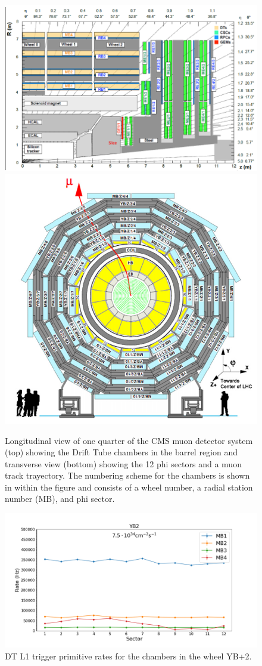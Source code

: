 \begin{figure}[hbtp]
\centering
\includegraphics[width=.8\linewidth]{tex/Part2/fig/DT/DT-longitudinal.png}
\includegraphics[width=.7\linewidth]{tex/Part2/fig/DT/DT-transverse.png}
\caption{
  Longitudinal view of one quarter of the CMS muon detector system (top) showing the Drift Tube chambers in the barrel region
  and transverse view (bottom) showing the 12 phi sectors and a muon track trayectory.
  The numbering scheme for the chambers is shown in within the figure and consists of a wheel number, a radial station number (MB), and phi sector.
}
\label{fig:DT_layout}
\end{figure}


\begin{figure}[hbtp]
\centering
\includegraphics[width=.7\linewidth]{tex/Part2/fig/DT/DT-RatesExtrapolated.png}
\caption{DT L1 trigger primitive rates for the chambers in the wheel YB+2.} 
\label{fig:DT_rates}
\end{figure}



